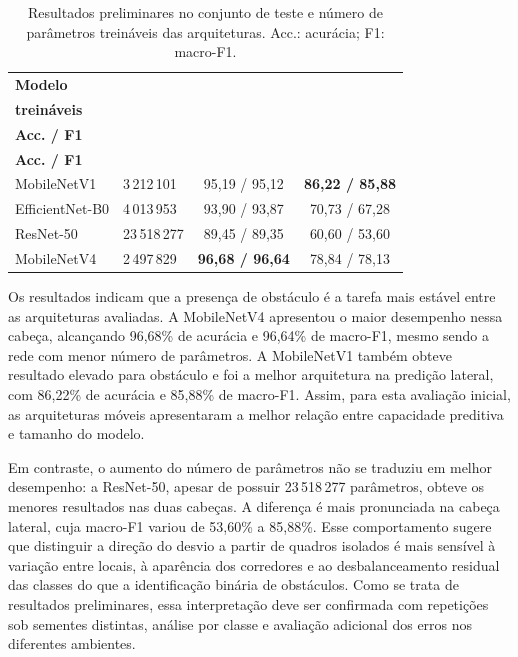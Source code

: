 \documentclass[conference]{IEEEtran}
\begin{document}
\begin{table}[t]
\caption{Resultados preliminares no conjunto de teste e número de parâmetros
treináveis das arquiteturas. Acc.: acurácia; F1: macro-F1.}
\label{tab:results_models}
\centering
\scriptsize
\renewcommand{\arraystretch}{1.12}
\setlength{\tabcolsep}{2pt}
\begin{tabular}{p{1.55cm}p{2.1cm}cc}
\toprule
\textbf{Modelo} &
\shortstack{\textbf{Parâmetros}\\\textbf{treináveis}} &
\shortstack{\textbf{Obstáculo (\%)}\\\textbf{Acc. / F1}} &
\shortstack{\textbf{Lateral (\%)}\\\textbf{Acc. / F1}} \\
\midrule
MobileNetV1 & 3\,212\,101 & 95,19 / 95,12 & \textbf{86,22 / 85,88} \\
EfficientNet-B0 & 4\,013\,953 & 93,90 / 93,87 & 70,73 / 67,28 \\
ResNet-50 & 23\,518\,277 & 89,45 / 89,35 & 60,60 / 53,60 \\
MobileNetV4 & 2\,497\,829 & \textbf{96,68 / 96,64} & 78,84 / 78,13 \\
\bottomrule
\end{tabular}
\end{table}

Os resultados indicam que a presença de obstáculo é a tarefa mais estável
entre as arquiteturas avaliadas. A MobileNetV4 apresentou o maior desempenho
nessa cabeça, alcançando 96,68\% de acurácia e 96,64\% de macro-F1, mesmo
sendo a rede com menor número de parâmetros. A MobileNetV1 também obteve
resultado elevado para obstáculo e foi a melhor arquitetura na predição
lateral, com 86,22\% de acurácia e 85,88\% de macro-F1. Assim, para esta
avaliação inicial, as arquiteturas móveis apresentaram a melhor relação entre
capacidade preditiva e tamanho do modelo.

Em contraste, o aumento do número de parâmetros não se traduziu em melhor
desempenho: a ResNet-50, apesar de possuir 23\,518\,277 parâmetros, obteve os
menores resultados nas duas cabeças. A diferença é mais pronunciada na cabeça
lateral, cuja macro-F1 variou de 53,60\% a 85,88\%. Esse comportamento sugere
que distinguir a direção do desvio a partir de quadros isolados é mais
sensível à variação entre locais, à aparência dos corredores e ao
desbalanceamento residual das classes do que a identificação binária de
obstáculos. Como se trata de resultados preliminares, essa interpretação deve
ser confirmada com repetições sob sementes distintas, análise por classe e
avaliação adicional dos erros nos diferentes ambientes.
\end{document}
